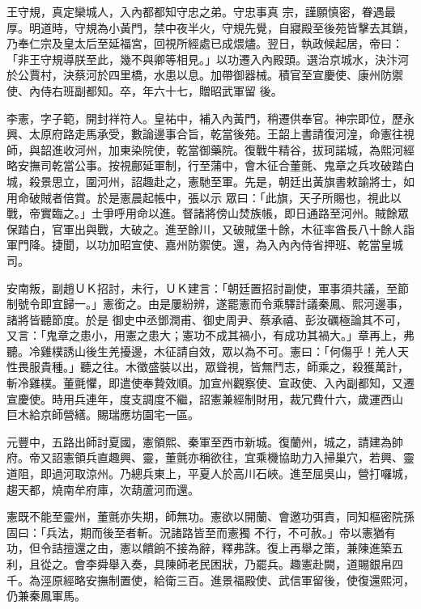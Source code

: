 \begin{pinyinscope}
 王守規，真定欒城人，入內都都知守忠之弟。守忠事真
 宗，謹願慎密，眷遇最厚。明道時，守規為小黃門，禁中夜半火，守規先覺，自寢殿至後苑皆擊去其鎖，乃奉仁宗及皇太后至延福宮，回視所經處已成煨燼。翌日，執政候起居，帝曰：「非王守規導朕至此，幾不與卿等相見。」以功遷入內殿頭。選治京城水，決汴河於公賈村，決蔡河於四里橋，水患以息。加帶御器械。積官至宣慶使、康州防禦使、內侍右班副都知。卒，年六十七，贈昭武軍留
 後。



 李憲，字子範，開封祥符人。皇祐中，補入內黃門，稍遷供奉官。神宗即位，歷永興、太原府路走馬承受，數論邊事合旨，乾當後苑。王韶上書請復河湟，命憲往視師，與韶進收河州，加東染院使，乾當御藥院。復戰牛精谷，拔珂諾城，為熙河經略安撫司乾當公事。按視鄜延軍制，行至蒲中，會木征合董氈、鬼章之兵攻破踏白城，殺景思立，圍河州，詔趣赴之，憲馳至軍。先是，朝廷出黃旗書敕諭將士，如用命破賊者倍賞。於是憲晨起帳中，張以示
 眾曰：「此旗，天子所賜也，視此以戰，帝實臨之。」士爭呼用命以進。督諸將傍山焚族帳，即日通路至河州。賊餘眾保踏白，官軍出與戰，大破之。進至餘川，又破賊堡十餘，木征率酋長八十餘人詣軍門降。捷聞，以功加昭宣使、嘉州防禦使。還，為入內內侍省押班、乾當皇城司。



 安南叛，副趙ＵＫ招討，未行，ＵＫ建言：「朝廷置招討副使，軍事須共議，至節制號令即宜歸一。」憲銜之。由是屢紛辨，遂罷憲而令乘驛計議秦鳳、熙河邊事，諸將皆聽節度。於是
 御史中丞鄧潤甫、御史周尹、蔡承禧、彭汝礪極論其不可，又言：「鬼章之患小，用憲之患大；憲功不成其禍小，有成功其禍大。」章再上，弗聽。冷雞樸誘山後生羌擾邊，木征請自效，眾以為不可。憲曰：「何傷乎！羌人天性畏服貴種。」聽之往。木徵盛裝以出，眾聳視，皆無鬥志，師乘之，殺獲萬計，斬冷雞樸。董氈懼，即遣使奉贄效順。加宣州觀察使、宣政使、入內副都知，又遷宣慶使。時用兵連年，度支調度不繼，詔憲兼經制財用，裁冗費什六，歲運西山
 巨木給京師營繕。賜瑞應坊園宅一區。



 元豐中，五路出師討夏國，憲領熙、秦軍至西市新城。復蘭州，城之，請建為帥府。帝又詔憲領兵直趣興、靈，董氈亦稱欲往，宜乘機協助力入掃巢穴，若興、靈道阻，即過河取涼州。乃總兵東上，平夏人於高川石峽。進至屈吳山，營打囉城，趨天都，燒南牟府庫，次葫蘆河而還。



 憲既不能至靈州，董氈亦失期，師無功。憲欲以開蘭、會邀功弭責，同知樞密院孫固曰：「兵法，期而後至者斬。況諸路皆至而憲獨
 不行，不可赦。」帝以憲猶有功，但令詰擅還之由，憲以饋餉不接為辭，釋弗誅。復上再舉之策，兼陳進築五利，且從之。會李舜舉入奏，具陳師老民困狀，乃罷兵。趣憲赴闕，道賜銀帛四千。為涇原經略安撫制置使，給衛三百。進景福殿使、武信軍留後，使復還熙河，仍兼秦鳳軍馬。




\end{pinyinscope}
